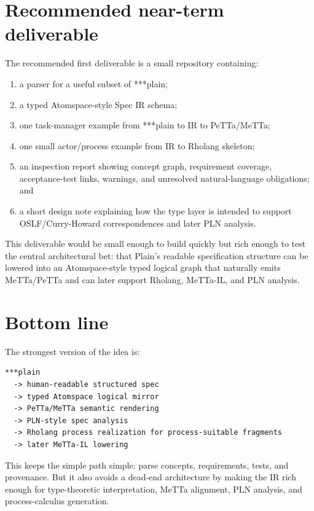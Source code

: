 \documentclass[11pt]{article}
\begin{document}
\section{Recommended near-term deliverable}

The recommended first deliverable is a small repository containing:
\begin{enumerate}
  \item a parser for a useful subset of ***plain;
  \item a typed Atomspace-style Spec IR schema;
  \item one task-manager example from ***plain to IR to PeTTa/MeTTa;
  \item one small actor/process example from IR to Rholang skeleton;
  \item an inspection report showing concept graph, requirement coverage,
        acceptance-test links, warnings, and unresolved natural-language
        obligations; and
  \item a short design note explaining how the type layer is intended to support
        OSLF/Curry-Howard correspondences and later PLN analysis.
\end{enumerate}

This deliverable would be small enough to build quickly but rich enough to test
the central architectural bet: that Plain's readable specification structure can
be lowered into an Atomspace-style typed logical graph that naturally emits
MeTTa/PeTTa and can later support Rholang, MeTTa-IL, and PLN analysis.

\section{Bottom line}

The strongest version of the idea is:
\begin{verbatim}
***plain
  -> human-readable structured spec
  -> typed Atomspace logical mirror
  -> PeTTa/MeTTa semantic rendering
  -> PLN-style spec analysis
  -> Rholang process realization for process-suitable fragments
  -> later MeTTa-IL lowering
\end{verbatim}

This keeps the simple path simple: parse concepts, requirements, tests, and
provenance.  But it also avoids a dead-end architecture by making the IR rich
enough for type-theoretic interpretation, MeTTa alignment, PLN analysis, and
process-calculus generation.
\end{document}
